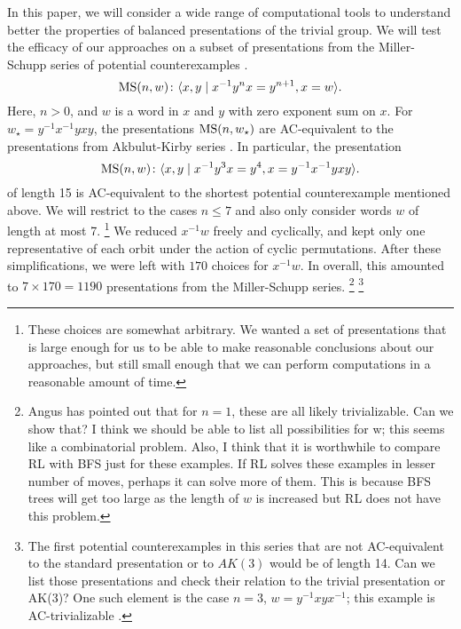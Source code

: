 In this paper, we will consider a wide range of computational tools to understand better the properties of balanced presentations of the trivial group. We will test the efficacy of our approaches on a subset of presentations from the Miller-Schupp series of potential counterexamples \cite{Miller-Schupp}.
\[
\text{MS}(n, w) \colon \langle x, y \mid x^{-1} y^n x = y^{n+1}, x = w\rangle.
\]
Here, $n > 0$, and $w$ is a word in $x$ and $y$ with zero exponent sum on $x$. For $w_\star = y^{-1} x^{-1} y x y$, the presentations $\text{MS}(n, w_\star)$ are AC-equivalent to the presentations from Akbulut-Kirby series \cite{MMS}. In particular, the presentation
\[
\text{MS}(n, w) \colon \langle x, y \mid x^{-1} y^3 x = y^{4}, x =  y^{-1} x^{-1} y x y\rangle.
\]
of length 15 is AC-equivalent to the shortest potential counterexample mentioned above. We will restrict to the cases $n \leq 7$ and also only consider words $w$ of length at most 7. 
\footnote{These choices are somewhat arbitrary. We wanted a set of presentations that is large enough for us to be able to make reasonable conclusions about our approaches, but still small enough that we can perform computations in a reasonable amount of time.  }
We reduced $x^{-1}w$ freely and cyclically, and kept only one representative of each orbit under the action of cyclic permutations. After these simplifications, we were left with $170$ choices for $x^{-1} w$. In overall, this amounted to $7 \times 170 = 1190$ presentations from the Miller-Schupp series.
\footnote{Angus has pointed out that for $n=1$, these are all likely trivializable.
Can we show that? 
I think we should be able to list all possibilities for w; this seems like a combinatorial problem.
Also, I think that it is worthwhile to compare RL with BFS just for these examples. If RL solves these examples in lesser number of moves, perhaps it can solve more of them. 
This is because BFS trees will get too large as the length of $w$ is increased but RL does not have this problem.
}
\footnote{The first potential counterexamples in this series that are not AC-equivalent to the standard presentation or to $AK(3)$ would be of length 14.
Can we list those presentations and	check their relation to the trivial presentation or AK(3)? One such element is the case $n=3$, $w = y^{-1} x y x^{-1}$; this example is AC-trivializable \cite{morse}.}
\newline




